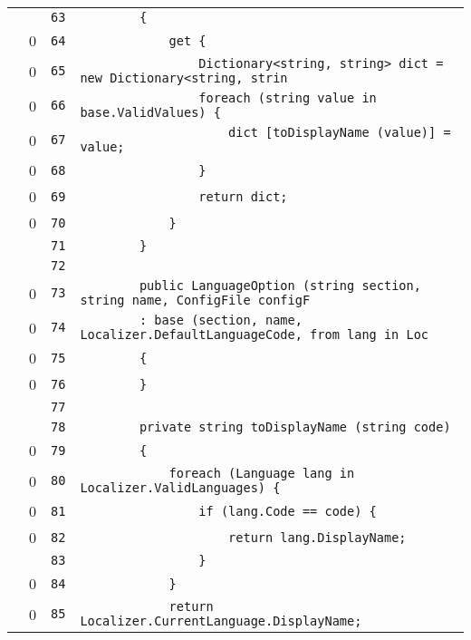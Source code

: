\documentclass[a4paper,10pt]{article}
\begin{document}
\begin{longtable}[l]{lrrl}
\cellcolor{gray} &  & \verb~63~ & \verb~        {~\\
\cellcolor{red} & 0 & \verb~64~ & \verb~            get {~\\
\cellcolor{red} & 0 & \verb~65~ & \verb~                Dictionary<string, string> dict = new Dictionary<string, strin~\\
\cellcolor{red} & 0 & \verb~66~ & \verb~                foreach (string value in base.ValidValues) {~\\
\cellcolor{red} & 0 & \verb~67~ & \verb~                    dict [toDisplayName (value)] = value;~\\
\cellcolor{red} & 0 & \verb~68~ & \verb~                }~\\
\cellcolor{red} & 0 & \verb~69~ & \verb~                return dict;~\\
\cellcolor{red} & 0 & \verb~70~ & \verb~            }~\\
\cellcolor{gray} &  & \verb~71~ & \verb~        }~\\
\cellcolor{gray} &  & \verb~72~ & \verb~~\\
\cellcolor{red} & 0 & \verb~73~ & \verb~        public LanguageOption (string section, string name, ConfigFile configF~\\
\cellcolor{red} & 0 & \verb~74~ & \verb~        : base (section, name, Localizer.DefaultLanguageCode, from lang in Loc~\\
\cellcolor{red} & 0 & \verb~75~ & \verb~        {~\\
\cellcolor{red} & 0 & \verb~76~ & \verb~        }~\\
\cellcolor{gray} &  & \verb~77~ & \verb~~\\
\cellcolor{gray} &  & \verb~78~ & \verb~        private string toDisplayName (string code)~\\
\cellcolor{red} & 0 & \verb~79~ & \verb~        {~\\
\cellcolor{red} & 0 & \verb~80~ & \verb~            foreach (Language lang in Localizer.ValidLanguages) {~\\
\cellcolor{red} & 0 & \verb~81~ & \verb~                if (lang.Code == code) {~\\
\cellcolor{red} & 0 & \verb~82~ & \verb~                    return lang.DisplayName;~\\
\cellcolor{gray} &  & \verb~83~ & \verb~                }~\\
\cellcolor{red} & 0 & \verb~84~ & \verb~            }~\\
\cellcolor{red} & 0 & \verb~85~ & \verb~            return Localizer.CurrentLanguage.DisplayName;~\\

\end{longtable}
\end{document}
